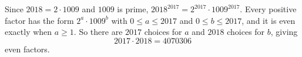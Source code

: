 Since $2018=2\cdot1009$ and $1009$ is prime, $2018^{2017}=2^{2017}\cdot1009^{2017}$. Every positive factor has the form $2^a\cdot1009^b$ with $0\le a\le2017$ and $0\le b\le2017$, and it is even exactly when $a\ge1$. So there are $2017$ choices for $a$ and $2018$ choices for $b$, giving
\[
2017\cdot2018=\boxed{4070306}
\]
even factors.
